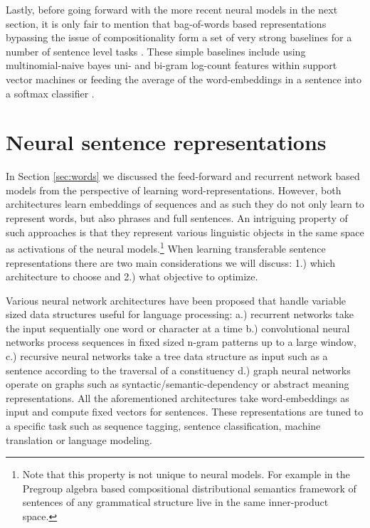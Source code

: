 Lastly, before going forward with the more recent neural models in the next section,
it is only fair to mention that bag-of-words
based representations bypassing the issue of compositionality form a set of very strong baselines
for a number of sentence level tasks \citep{hill2016learning}.
These simple baselines include using multinomial-naive bayes uni- and bi-gram 
log-count features within support vector machines \citep{wang2012baselines} or
feeding the average of the word-embeddings in a sentence into a softmax classifier \citep{joulin2016bag}.


\section{Neural sentence representations}
\label{sec:trans-sentence}

In Section \ref{sec:words} we discussed the feed-forward \citep{bengio2003neural}
and recurrent network based models \citep{mikolov2010recurrent} from the perspective
of learning word-representations. However, both architectures learn embeddings
of sequences and  as such they do not only learn to represent
words, but also phrases and full sentences. An intriguing property of such approaches is that
they represent various linguistic objects in the same space as activations of the neural models.\footnote{Note that this property is not unique to neural models. For example in the Pregroup algebra based compositional distributional
semantics framework of \cite{coecke2010mathematical} 
sentences of any grammatical structure live in the same inner-product space.} 
When learning transferable
sentence representations there are two main considerations we will discuss:
1.) which architecture to choose and 2.) what objective to optimize.

Various neural network architectures have been proposed that
handle variable sized data structures useful for language processing: a.) recurrent networks 
take the input sequentially one word or character at a time
b.) convolutional neural networks
\citep{kalchbrenner2014convolutional,zhang2015character,conneau2016very,chen2013learning}
process sequences in fixed sized n-gram patterns up to a large window,
c.) recursive neural networks \citep{goller1996learning,socher2011parsing,tai2015improved}
take a tree data structure as input such as a sentence according to the traversal of a
constituency
d.) graph neural networks operate on graphs \citep{marcheggiani2017encoding} such as
syntactic/semantic-dependency or abstract meaning representations.
All the aforementioned architectures take word-embeddings as input 
and compute fixed vectors for sentences. 
These representations are tuned to a specific task such as sequence tagging,
sentence classification, machine translation or language modeling.


